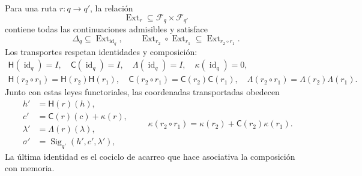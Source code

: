 Para una ruta \(r:q\to q'\), la relación
\begin{equation}
\operatorname{Ext}_r\subseteq\mathcal F_q\times\mathcal F_{q'}
\label{p12-83-c3-s1:eq:tpk-extension-relation}
\end{equation}
contiene todas las continuaciones admisibles y satisface
\[
\Delta_q\subseteq\operatorname{Ext}_{\operatorname{id}_q},
\qquad
\operatorname{Ext}_{r_2}\circ\operatorname{Ext}_{r_1}
\subseteq\operatorname{Ext}_{r_2\circ r_1}.
\]
Los transportes respetan identidades y composición:
\begin{equation}
\begin{gathered}
\mathsf H(\operatorname{id}_q)=I,
\quad \mathsf C(\operatorname{id}_q)=I,
\quad \mathsf\Lambda(\operatorname{id}_q)=I,
\quad \kappa(\operatorname{id}_q)=0,\\
\mathsf H(r_2\!\circ r_1)=\mathsf H(r_2)\mathsf H(r_1),
\quad
\mathsf C(r_2\!\circ r_1)=\mathsf C(r_2)\mathsf C(r_1),
\quad
\mathsf\Lambda(r_2\!\circ r_1)=
\mathsf\Lambda(r_2)\mathsf\Lambda(r_1).
\end{gathered}
\label{p12-83-c3-s1:eq:tpk-functorial-transport}
\end{equation}
Junto con estas leyes functoriales, las coordenadas transportadas obedecen
\begin{equation}
\begin{aligned}
h'&=\mathsf H(r)(h),\\
c'&=\mathsf C(r)(c)+\kappa(r),\\
\lambda'&=\mathsf\Lambda(r)(\lambda),\\
\sigma'&=\operatorname{Sig}_{q'}(h',c',\lambda'),
\end{aligned}
\qquad
\kappa(r_2\circ r_1)
=\kappa(r_2)+\mathsf C(r_2)\kappa(r_1).
\label{p12-83-c3-s1:eq:tpk-typed-transport}
\end{equation}
La última identidad es el cociclo de acarreo que hace asociativa la
composición con memoria.

